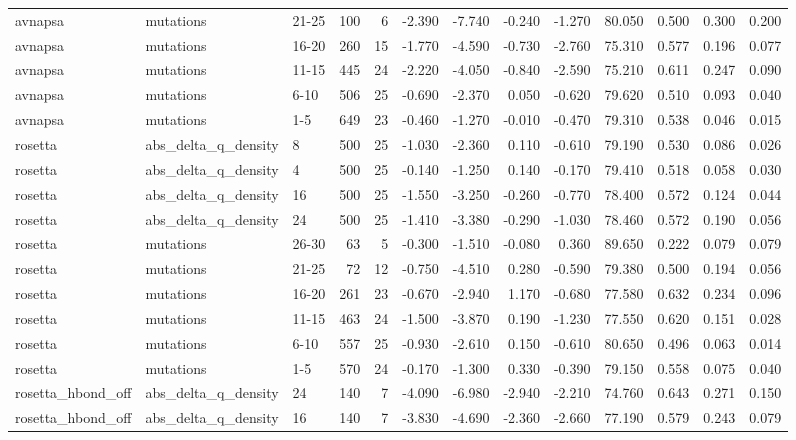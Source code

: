 \begin{table}
\begin{tabular}{lllrrrrrrrrrr}
avnapsa & mutations & 21-25 & 100 & 6 & -2.390 & -7.740 & -0.240 & -1.270 & 80.050 & 0.500 & 0.300 & 0.200 \\
avnapsa & mutations & 16-20 & 260 & 15 & -1.770 & -4.590 & -0.730 & -2.760 & 75.310 & 0.577 & 0.196 & 0.077 \\
avnapsa & mutations & 11-15 & 445 & 24 & -2.220 & -4.050 & -0.840 & -2.590 & 75.210 & 0.611 & 0.247 & 0.090 \\
avnapsa & mutations & 6-10 & 506 & 25 & -0.690 & -2.370 & 0.050 & -0.620 & 79.620 & 0.510 & 0.093 & 0.040 \\
avnapsa & mutations & 1-5 & 649 & 23 & -0.460 & -1.270 & -0.010 & -0.470 & 79.310 & 0.538 & 0.046 & 0.015 \\
rosetta & abs\_delta\_q\_density & 8 & 500 & 25 & -1.030 & -2.360 & 0.110 & -0.610 & 79.190 & 0.530 & 0.086 & 0.026 \\
rosetta & abs\_delta\_q\_density & 4 & 500 & 25 & -0.140 & -1.250 & 0.140 & -0.170 & 79.410 & 0.518 & 0.058 & 0.030 \\
rosetta & abs\_delta\_q\_density & 16 & 500 & 25 & -1.550 & -3.250 & -0.260 & -0.770 & 78.400 & 0.572 & 0.124 & 0.044 \\
rosetta & abs\_delta\_q\_density & 24 & 500 & 25 & -1.410 & -3.380 & -0.290 & -1.030 & 78.460 & 0.572 & 0.190 & 0.056 \\
rosetta & mutations & 26-30 & 63 & 5 & -0.300 & -1.510 & -0.080 & 0.360 & 89.650 & 0.222 & 0.079 & 0.079 \\
rosetta & mutations & 21-25 & 72 & 12 & -0.750 & -4.510 & 0.280 & -0.590 & 79.380 & 0.500 & 0.194 & 0.056 \\
rosetta & mutations & 16-20 & 261 & 23 & -0.670 & -2.940 & 1.170 & -0.680 & 77.580 & 0.632 & 0.234 & 0.096 \\
rosetta & mutations & 11-15 & 463 & 24 & -1.500 & -3.870 & 0.190 & -1.230 & 77.550 & 0.620 & 0.151 & 0.028 \\
rosetta & mutations & 6-10 & 557 & 25 & -0.930 & -2.610 & 0.150 & -0.610 & 80.650 & 0.496 & 0.063 & 0.014 \\
rosetta & mutations & 1-5 & 570 & 24 & -0.170 & -1.300 & 0.330 & -0.390 & 79.150 & 0.558 & 0.075 & 0.040 \\
rosetta\_hbond\_off & abs\_delta\_q\_density & 24 & 140 & 7 & -4.090 & -6.980 & -2.940 & -2.210 & 74.760 & 0.643 & 0.271 & 0.150 \\
rosetta\_hbond\_off & abs\_delta\_q\_density & 16 & 140 & 7 & -3.830 & -4.690 & -2.360 & -2.660 & 77.190 & 0.579 & 0.243 & 0.079 \\

\end{tabular}
\end{table}
